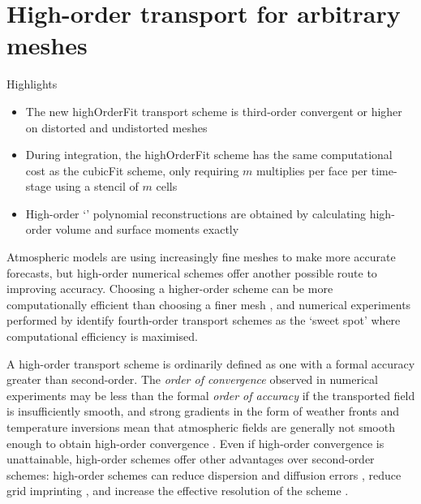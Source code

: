 \chapter{High-order transport for arbitrary meshes}
\label{ch:highOrder}

\begin{highlights}
{\Large Highlights}
\begin{itemize}
	\item The new highOrderFit transport scheme is third-order convergent or higher on distorted and undistorted meshes
	\item During integration, the highOrderFit scheme has the same computational cost as the cubicFit scheme, only requiring $m$ multiplies per face per time-stage using a stencil of $m$ cells
	\item High-order `\kexact' polynomial reconstructions are obtained by calculating high-order volume and surface moments exactly
\end{itemize}
\end{highlights}

Atmospheric models are using increasingly fine meshes to make more accurate forecasts, but high-order numerical schemes offer another possible route to improving accuracy.
Choosing a higher-order scheme can be more computationally efficient than choosing a finer mesh \citep{waruszewski2018}, and numerical experiments performed by \citet{ullrich2014} identify fourth-order transport schemes as the `sweet spot'  where computational efficiency is maximised.

A high-order transport scheme is ordinarily defined as one with a formal accuracy greater than second-order.
The \emph{order of convergence} observed in numerical experiments may be less than the formal \emph{order of accuracy} if the transported field is insufficiently smooth, and strong gradients in the form of weather fronts and temperature inversions mean that atmospheric fields are generally not smooth enough to obtain high-order convergence \citep{holdaway2008}. 
Even if high-order convergence is unattainable, high-order schemes offer other advantages over second-order schemes: high-order schemes can reduce dispersion and diffusion errors \citep{ullrich-jablonowski2012,waruszewski2018}, reduce grid imprinting \citep{mccorquodale2015}, and increase the effective resolution of the scheme \citep{ullrich2014}.

